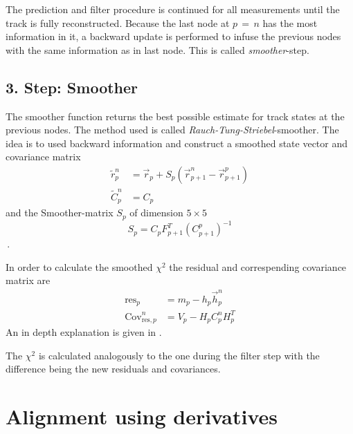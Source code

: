 The prediction and filter procedure is continued for all measurements until the track is fully reconstructed.
Because the last node at $p \, = \, n$ has the most information in it, a backward update is performed to infuse the previous nodes with the same information as in last node.
This is called \textit{smoother}-step.

\subsection{3. Step: Smoother}
The smoother function returns the best possible estimate for track states at
the previous nodes. The method used is called \textit{Rauch-Tung-Striebel}-smoother.
The idea is to used backward information and construct a smoothed state vector and covariance matrix
\begin{align}
  \tilde{r}_p^n &= \vec{r}_p + S_p \left( \vec{r}_{p+1}^n - \vec{r}_{p+1}^p \right) \\
  \tilde{C}_p^n &= C_p
\end{align}
and the Smoother-matrix $S_p$ of dimension $5\times5$
\begin{equation}
  S_p = C_p F_{p+1}^T \left( C_{p+1}^p \right)^{-1}
\end{equation}\,.

In order to calculate the smoothed $\chi^2$ the residual and correspending covariance matrix are
\begin{align}
  \text{res}_p &= m_p - h_p \vec{h}_p^n \\
  \text{Cov}_{\text{res},p}^n &= V_p - H_p C_p^n H_p^T
\end{align}
An in depth explanation is given in \cite{RTS}.

The $\chi^2$ is calculated analogously to the one during the filter step with the difference being the new residuals and covariances.

\section{Alignment using derivatives}
\label{sec:derivatives}




%
%
%
%


